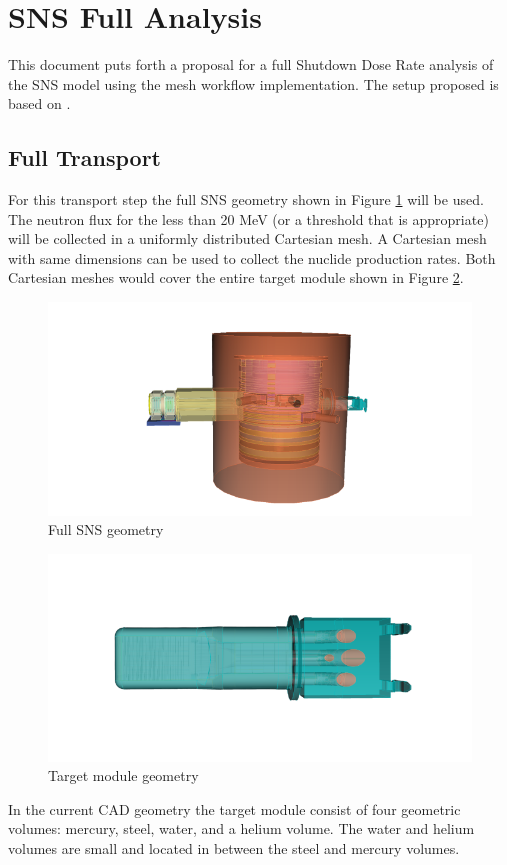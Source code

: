 \section{SNS Full Analysis}

This document puts forth a proposal for a full Shutdown Dose Rate analysis
of the SNS model using the mesh workflow implementation.
The setup proposed is based on \cite{SNS2018}.

\subsection{Full Transport}
For this transport step the full SNS geometry shown in Figure
\ref{fig:sns_full_geom} will be used.
The neutron flux for the less than
20 MeV (or a threshold that is appropriate) will be collected in a
uniformly distributed Cartesian mesh. A Cartesian mesh with same
dimensions can be used to collect the nuclide production rates. 
Both Cartesian meshes would cover the entire target module shown in Figure
\ref{fig:sns_target}.

\begin{figure}[ht!]
	\centering
	\includegraphics[scale=0.3,trim={3cm 0.5cm 4.5cm 1cm},clip]{figs/SNS_full.png}
	\caption{Full SNS geometry}
	\label{fig:sns_full_geom}
\end{figure}

\begin{figure}[ht!]
	\centering
	\includegraphics[scale=0.3,trim={3cm 0.5cm 4.5cm 1cm},clip]{figs/SNS_target.png}
	\caption{Target module geometry}
	\label{fig:sns_target}
\end{figure}
In the current CAD geometry the target module consist of four geometric
volumes: mercury, steel, water, and a helium volume.
The water and helium volumes are small and located in between the steel
and mercury volumes.

